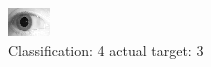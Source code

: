 \begin{figure}[h!]
\begin{center}
\includegraphics[width=0.60\columnwidth]{figures/ID1875_class_4_target_3.png}
\end{center}
\caption{ Classification: 4 actual target: 3}
\label{fig:ID1875_class_4_target_3}
\end{figure}
